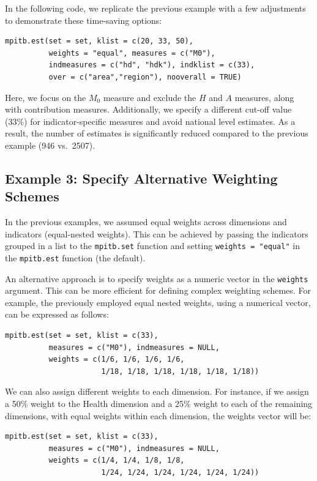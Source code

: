 In the following code, we replicate the previous example with a few adjustments to demonstrate these time-saving options:

\begin{verbatim}
mpitb.est(set = set, klist = c(20, 33, 50),
          weights = "equal", measures = c("M0"), 
          indmeasures = c("hd", "hdk"), indklist = c(33), 
          over = c("area","region"), nooverall = TRUE)
\end{verbatim}

Here, we focus on the \(M_0\) measure and exclude the \(H\) and \(A\) measures, along with contribution measures. Additionally, we specify a different cut-off value (33\%) for indicator-specific measures and avoid national level estimates. As a result, the number of estimates is significantly reduced compared to the previous example (946 vs.~2507).

\subsection{Example 3: Specify Alternative Weighting Schemes}\label{example-3-specify-alternative-weighting-schemes}

In the previous examples, we assumed equal weights across dimensions and indicators (equal-nested weights). This can be achieved by passing the indicators grouped in a list to the \texttt{mpitb.set} function and setting \texttt{weights\ =\ "equal"} in the \texttt{mpitb.est} function (the default).

An alternative approach is to specify weights as a numeric vector in the \texttt{weights} argument. This can be more efficient for defining complex weighting schemes. For example, the previously employed equal nested weights, using a numerical vector, can be expressed as follows:

\begin{verbatim}
mpitb.est(set = set, klist = c(33), 
          measures = c("M0"), indmeasures = NULL,
          weights = c(1/6, 1/6, 1/6, 1/6, 
                      1/18, 1/18, 1/18, 1/18, 1/18, 1/18))
\end{verbatim}

We can also assign different weights to each dimension. For instance, if we assign a 50\% weight to the Health dimension and a 25\% weight to each of the remaining dimensions, with equal weights within each dimension, the weights vector will be:

\begin{verbatim}
mpitb.est(set = set, klist = c(33), 
          measures = c("M0"), indmeasures = NULL,
          weights = c(1/4, 1/4, 1/8, 1/8, 
                      1/24, 1/24, 1/24, 1/24, 1/24, 1/24))
\end{verbatim}


